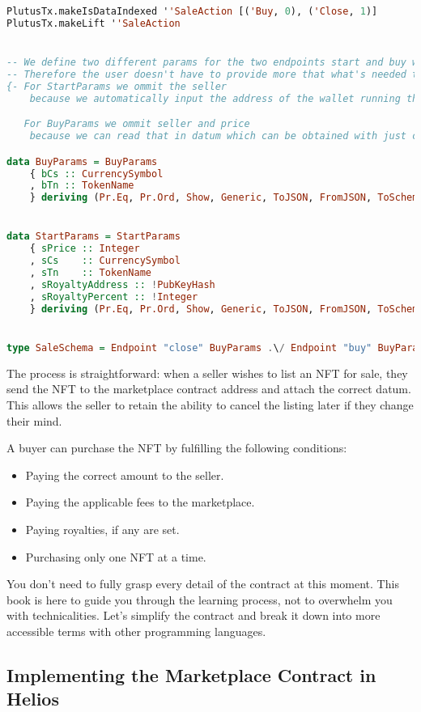 \begin{lstlisting}[language=haskell, caption=Types Code for Marketplace Contract]
PlutusTx.makeIsDataIndexed ''SaleAction [('Buy, 0), ('Close, 1)]
PlutusTx.makeLift ''SaleAction


-- We define two different params for the two endpoints start and buy with the minimal info needed.
-- Therefore the user doesn't have to provide more that what's needed to execute the said action.
{- For StartParams we ommit the seller
    because we automatically input the address of the wallet running the startSale enpoint

   For BuyParams we ommit seller and price
    because we can read that in datum which can be obtained with just cs and tn of the sold token -}

data BuyParams = BuyParams
    { bCs :: CurrencySymbol
    , bTn :: TokenName
    } deriving (Pr.Eq, Pr.Ord, Show, Generic, ToJSON, FromJSON, ToSchema)


data StartParams = StartParams
    { sPrice :: Integer
    , sCs    :: CurrencySymbol
    , sTn    :: TokenName
    , sRoyaltyAddress :: !PubKeyHash
    , sRoyaltyPercent :: !Integer
    } deriving (Pr.Eq, Pr.Ord, Show, Generic, ToJSON, FromJSON, ToSchema)


type SaleSchema = Endpoint "close" BuyParams .\/ Endpoint "buy" BuyParams .\/ Endpoint "start" StartParams
\end{lstlisting}
The process is straightforward: when a seller wishes to list an NFT for sale, they send the NFT to the marketplace contract address and attach the correct datum. This allows the seller to retain the ability to cancel the listing later if they change their mind.

A buyer can purchase the NFT by fulfilling the following conditions: 
\begin{itemize}
    \item Paying the correct amount to the seller.
    \item Paying the applicable fees to the marketplace.
    \item Paying royalties, if any are set.
    \item Purchasing only one NFT at a time.
\end{itemize}

You don't need to fully grasp every detail of the contract at this moment. This book is here to guide you through the learning process, not to overwhelm you with technicalities. Let's simplify the contract and break it down into more accessible terms with other programming languages.

\subsection{Implementing the Marketplace Contract in Helios}

